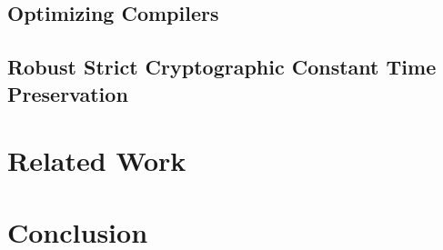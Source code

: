 \documentclass[acmsmall,review,screen,dvipsnames]{acmart}
\begin{document}
\subsection{Optimizing Compilers}\label{subsec:cs:opts}
\subsection{Robust Strict Cryptographic Constant Time Preservation}\label{subsec:cs:scct}



\section{Related Work}\label{sec:relwork}
\section{Conclusion}\label{sec:concl}


\begin{acks}
\end{acks}




\appendix
\end{document}
